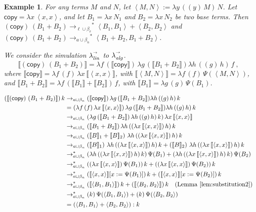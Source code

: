 \documentclass{LMCS}
\newtheorem{example}[theorem]{Example}
\newcommand{\xllin}[1]{\ensuremath{\lambda^{\raisebox{0.5ex}{\textrm{\tiny $#1$}}}_{{\it lin}}}}
\newcommand{\xlalg}[1]{\ensuremath{\lambda^{\raisebox{0.5ex}{\textrm{\tiny $#1$}}}_{{\it alg}}}}
\newcommand{\llinred}{\xllin{\rightarrow}}
\newcommand{\lalgred}{\xlalg{\rightarrow}}
\newcommand{\xto}[1]{\ensuremath{\rightarrow_{#1}}}
\newcommand{\tobalgred}{\xto{a\cup\beta_n}}
\newcommand{\stoblinred}{\ensuremath{\xto{\ell\cup\beta_v}^{\ast}}}
\newcommand{\stobalgred}{\ensuremath{\xto{a\cup\beta_n}^{\ast}}}
\newcommand{\wt}[1]{\llbracket{#1}\rrbracket}
\newcommand{\pair}[2]{\left\langle #1,#2\right\rangle}
\begin{document}
\begin{example}
  \label{ex:1}
  For any terms $M$ and $N$, let $\pair M N := \lambda y\,((y)\,M)\,N$.  Let $\textsf{copy}=\lambda x\, \pair x x$,  and let $B_1=\lambda x\, N_1$ and $B_2=\lambda x\, N_2$ be two base terms. Then $(\textsf{copy})~(B_1+B_2) \stoblinred
  \pair {B_1} {B_1} + \pair {B_2} {B_2}$ and $(\textsf{copy})~(B_1+B_2)\stobalgred
  \pair{B_1+B_2}{B_1+B_2}$.

  We consider the simulation $\llinred$ to $\lalgred$.
  \[
    \wt{(\textsf{copy})~(B_1+B_2) }=
    \lambda f\, (\wt{\textsf{copy}})\,
    \lambda g\, (\wt{B_1+B_2})\lambda h\, ((g)\,h)\,f\ ,
  \]
  where
  $\wt{\textsf{copy}}=
  \lambda f\, (f)\,\lambda x\, \wt{\pair x x}$,
  with
  $\wt{\pair M N}=
  \lambda f\, (f)\, \Psi(\pair M N)$,
  and $\wt{B_1+B_2}=
  \lambda f\, (\wt{B_1}+\wt{B_2})\,f$, with 
  $\wt{B_1}=
  \lambda g\, (g)\,\Psi(B_1)$.


  \begin{align*}
    (\wt{(\textsf{copy})~(B_1+B_2)})\,k
    &\tobalgred
    (\wt{\textsf{copy}})\,
    \lambda g\, (\wt{B_1+B_2})\lambda h\,((g)\,h)\,k
    \\
    &=
    (\lambda f\, (f)\,\lambda x\, \wt{\pair x x})\,
    \lambda g\, (\wt{B_1+B_2})\lambda h\, ((g)\,h)\,k
    \\
    &\tobalgred
    (\lambda g\, (\wt{B_1+B_2})\, \lambda h\, ((g)\,h)\,k)\,
    \lambda x\, \wt{\pair x x}
    \\
    &\tobalgred
    (\wt{B_1+B_2})\,\lambda h\, ((\lambda x\, \wt{\pair x x})\,h)\,k
    \\
    &\tobalgred
    (\wt B_1  + \wt B_2)\,
    \,\lambda h\, ((\lambda x\, \wt{\pair x x})\,h)\,k\\
    &\tobalgred
    (\wt B_1)\,
    \,\lambda h\, ((\lambda x\, \wt{\pair x x})\,h)\,k
    +
    (\wt B_2)\,
    \,\lambda h\, ((\lambda x\, \wt{\pair x x})\,h)\,k
    \\
    &\stobalgred
    (\lambda h\, ((\lambda x\, \wt{\pair x x})\,h)\,k)\, \Psi(B_1)
    +
    (\lambda h\, ((\lambda x\, \wt{\pair x x})\,h)\,k)\, \Psi(B_2)
    \\
    &\stobalgred
    ((\lambda x\, \wt{\pair x x})\,\Psi(B_1))\,k 
    +
    ((\lambda x\, \wt{\pair x x})\,\Psi(B_2))\,k 
    \\
    &\stobalgred
    (\wt{\pair x x}[x:= \Psi(B_1)])\,k 
    +
    (\wt{\pair x x}[x:= \Psi(B_2)])\,k  
    \\
    &\stobalgred
    (\wt{\pair {B_1}{B_1}})\,k 
    +
    (\wt{\pair {B_2}{B_2}})\,k
    \quad \textrm{(Lemma \ref{lem:substitution2})}
    \\
    &\stobalgred
    (k) \, \Psi({\pair {B_1}{B_1}})
    +
    (k) \, \Psi({\pair {B_2}{B_2}})\\
    &=
    ({\pair {B_1}{B_1}} + {\pair {B_2}{B_2}}):k
  \end{align*}
\end{example}
\end{document}
